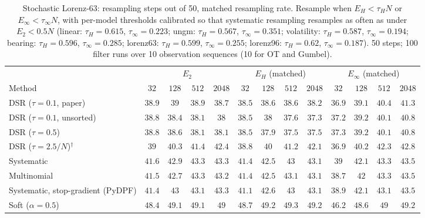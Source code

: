 \begin{table}[ht]
\centering
\small
\caption{Stochastic Lorenz-63: resampling steps out of 50, matched resampling rate. Resample when $E_H<\tau_HN$ or $E_\infty<\tau_\infty N$, with per-model thresholds calibrated so that systematic resampling resamples as often as under $E_2<0.5N$ (linear: $\tau_H{=}0.615$, $\tau_\infty{=}0.223$; ungm: $\tau_H{=}0.567$, $\tau_\infty{=}0.351$; volatility: $\tau_H{=}0.587$, $\tau_\infty{=}0.194$; bearing: $\tau_H{=}0.596$, $\tau_\infty{=}0.285$; lorenz63: $\tau_H{=}0.599$, $\tau_\infty{=}0.255$; lorenz96: $\tau_H{=}0.62$, $\tau_\infty{=}0.187$). 50 steps; 100 filter runs over 10 observation sequences (10 for OT and Gumbel).}
\label{tab:trigger-matched-lorenz63-resampling_steps}
\begin{adjustbox}{max width=\linewidth}
\begin{tabular}{lcccc|cccc|cccc}
\toprule
 & \multicolumn{4}{c}{$E_2$} & \multicolumn{4}{c}{$E_H$ (matched)} & \multicolumn{4}{c}{$E_\infty$ (matched)} \\
\cmidrule(lr){2-5} \cmidrule(lr){6-9} \cmidrule(lr){10-13}
Method & $32$ & $128$ & $512$ & $2048$ & $32$ & $128$ & $512$ & $2048$ & $32$ & $128$ & $512$ & $2048$ \\
\midrule
DSR ($\tau{=}0.1$, paper) & $38.9$ & $39$ & $38.9$ & $38.7$ & $38.5$ & $38.6$ & $38.6$ & $38.2$ & $36.9$ & $39.1$ & $40.4$ & $41.3$ \\
DSR ($\tau{=}0.1$, unsorted) & $38.8$ & $38.4$ & $38.1$ & $38$ & $38.5$ & $38$ & $37.6$ & $37.3$ & $37.2$ & $39.2$ & $40.1$ & $40.8$ \\
DSR ($\tau{=}0.5$) & $38.8$ & $38.6$ & $38.1$ & $38.1$ & $38.5$ & $37.9$ & $37.5$ & $37.5$ & $37.3$ & $39.2$ & $40.1$ & $40.8$ \\
DSR ($\tau{=}2.5/N$)$^\dagger$ & $39$ & $40.3$ & $41.4$ & $42.4$ & $38.8$ & $40$ & $41.2$ & $42.1$ & $36.9$ & $40.2$ & $42.3$ & $42.8$ \\
\midrule
Systematic & $41.6$ & $42.9$ & $43.3$ & $43.3$ & $41.4$ & $42.5$ & $43$ & $43.1$ & $39$ & $42.1$ & $43.3$ & $43.5$ \\
Multinomial & $41.5$ & $42.7$ & $43.3$ & $43.2$ & $41.4$ & $42.5$ & $43.1$ & $43.1$ & $38.7$ & $42$ & $43.3$ & $43.5$ \\
Systematic, stop-gradient (PyDPF) & $41.4$ & $43$ & $43.1$ & $43.3$ & $41.1$ & $42.6$ & $43$ & $43.1$ & $38.9$ & $42.1$ & $43.1$ & $43.5$ \\
Soft ($\alpha{=}0.5$) & $48.4$ & $49.1$ & $49.1$ & $49$ & $48.7$ & $49.2$ & $49.3$ & $49.2$ & $46.2$ & $48.6$ & $49$ & $49.2$ \\

\end{tabular}
\end{adjustbox}
\end{table}
